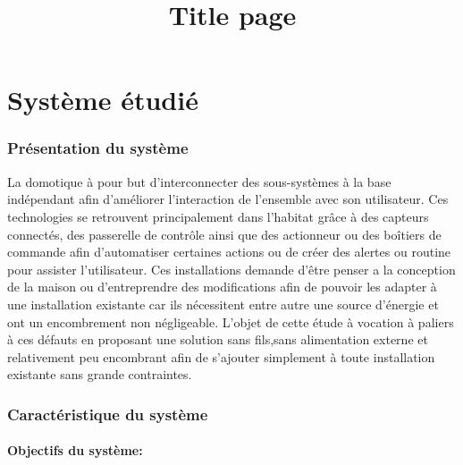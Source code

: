 \documentclass{rapportENS}
\title{Title page}
\begin{document}

\fairepagedegarde %
\tabledematieres %


\part{Système étudié}
 \section{Présentation du système}
 La domotique à pour but d'interconnecter des sous-systèmes à la base indépendant afin d'améliorer l'interaction de l'ensemble avec son utilisateur. Ces technologies se retrouvent principalement dans l'habitat grâce à des capteurs connectés, des passerelle de contrôle ainsi que des actionneur ou des boîtiers de commande afin d'automatiser certaines actions ou de créer des alertes ou routine pour assister l'utilisateur. Ces installations demande d'être penser a la conception de la maison ou d'entreprendre des modifications afin de pouvoir les adapter à une installation existante car ils nécessitent entre autre une source d'énergie et ont un encombrement non négligeable. L'objet de cette étude à vocation à paliers à ces défauts en proposant une solution sans fils,sans alimentation externe et relativement peu encombrant afin de s'ajouter simplement à toute installation existante sans grande contraintes. 
 
 \section{Caractéristique du système}
 \subsection{Objectifs du système:}
\end{document}

